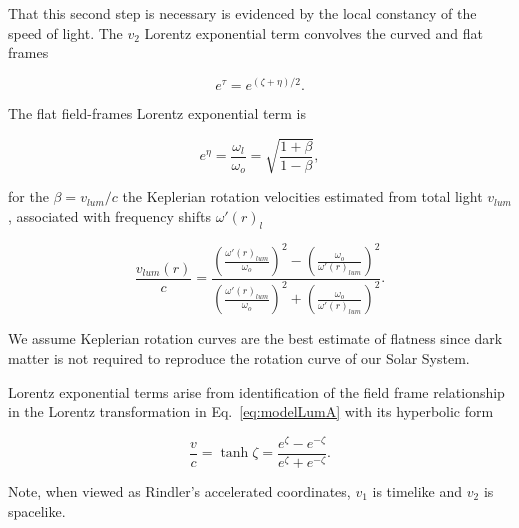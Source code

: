 \documentclass[reprint,%
 amsmath,amssymb,
 aps,
]{revtex4-1}
\begin{document}
 That this second step is necessary is evidenced by the local constancy of the speed of light.  The   $v_2$   Lorentz exponential term   convolves the curved and flat frames
 
\begin{equation}
    e^{\tau}=   e^{(\zeta+\eta)/2}.
\end{equation}
 
The flat field-frames
Lorentz exponential term is 

\begin{equation}
    e^{\eta}=\frac{\omega_{l}}{\omega_o}= \sqrt{\frac{1+\beta}{1-\beta}},  
    \label{eq:flat}
\end{equation}  
     
for  the
$\beta = v_{lum}/c$ the
Keplerian rotation velocities  estimated from total light  $v_{lum}$, associated with  frequency shifts $\omega'(r)_{l}$         

 
 \begin{equation}
 \frac{v_{lum}(r) }{c}=
\frac{  \left( \frac{\omega'(r)_{lum}}{\omega_o}\right)^2 -  \left( \frac{\omega_o}{\omega'(r)_{lum}} \right)^2 }{  \left( \frac{\omega'(r)_{lum}}{\omega_o}\right)^2  +  \left( \frac{\omega_o}{\omega'(r)_{lum}}\right)^2 }. 
\label{eq:lumlorentz}
\end{equation} 
 
 
  We assume Keplerian rotation curves are     the best estimate of flatness since dark matter is not required to  reproduce the rotation curve of our Solar System.  
 
 
 
  Lorentz exponential terms arise from identification of the field frame relationship
  in  the  Lorentz transformation in Eq.~\ref{eq:modelLumA}
  with its  hyperbolic form\cite{rindler2013essential} 


     \begin{equation}
         \frac{v}{c} = \tanh \zeta = \frac{e^\zeta - e^{-\zeta}}{e^\zeta + e^{-\zeta}} .   
         \label{boost}
     \end{equation} 


  



Note, when viewed as    Rindler's accelerated coordinates\cite{MTW,Wald, rindler2013essential}, $v_1$ is  timelike   and $v_2$ is spacelike. 



  
  
  
  
   
    
\end{document}

